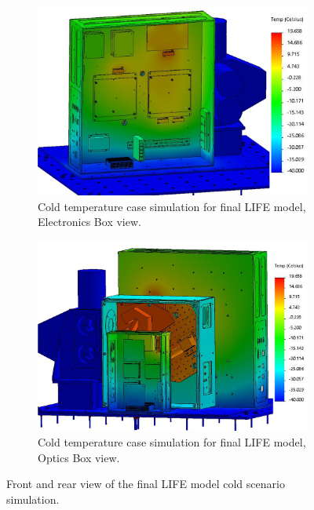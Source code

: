 \begin{figure}
    \centering
    \begin{subfigure}[h]{0.8\textwidth}
        \centering
        \includegraphics[width=\textwidth]{chap3_images/LIFE_V5_final_images/Iteration_1_ebox_no_labels_FIXED.png}
        \caption{Cold temperature case simulation for final LIFE model, Electronics Box view.}
        \label{fig:LIFE_V5_FINAL_TA_COLD_EBOX}
    \end{subfigure}
    \begin{subfigure}[h]{0.8\textwidth}
        \centering
        \includegraphics[width=\textwidth]{chap3_images/LIFE_V5_final_images/Iteration_1_no_labels_FIXED.png}
        \caption{Cold temperature case simulation for final LIFE model, Optics Box view.}
        \label{fig:LIFE_V5_FINAL_TA_COLD_OBOX}
    \end{subfigure}
    \caption{Front and rear view of the final LIFE model cold scenario simulation.}
    \label{LIFE_V5_FINAL_TA_COLD}
\end{figure}

